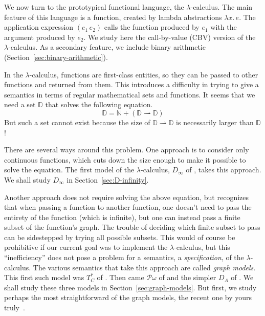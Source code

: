 \documentclass{tufte-handout}
\newcommand{\LAM}[1]{\lambda #1.\,}
\newcommand{\pto}[0]{\rightharpoonup}
\begin{document}
We now turn to the prototypical functional language, the
$\lambda$-calculus. The main feature of this language is a function,
created by lambda abstractions $\LAM{x}e$. The application expression
$(e_1\,e_2)$ calls the function produced by $e_1$ with the argument
produced by $e_2$. We study here the call-by-value (CBV) version of
the $\lambda$-calculus.  As a secondary feature, we include binary
arithmetic (Section~\ref{sec:binary-arithmetic}).

In the $\lambda$-calculus, functions are first-class entities, so they
can be passed to other functions and returned from them. This
introduces a difficulty in trying to give a semantics in terms of
regular mathematical sets and functions. It seems that we need a set
$\mathbb{D}$ that solves the following equation.
\[
   \mathbb{D} = \mathbb{N} + (\mathbb{D} \pto \mathbb{D})
\]
But such a set cannot exist because the size of $\mathbb{D} \pto
\mathbb{D}$ is necessarily larger than $\mathbb{D}$!

There are several ways around this problem. One approach is to
consider only continuous functions, which cuts down the size enough to
make it possible to solve the equation. The first model of the
$\lambda$-calculus, $D_\infty$ of \citet{Scott:1970dp}, takes this
approach. We shall study $D_\infty$ in Section~\ref{sec:D-infinity}.

Another approach does not require solving the above equation, but
recognizes that when passing a function to another function, one
doesn't need to pass the entirety of the function (which is infinite),
but one can instead pass a finite subset of the function's graph.  The
trouble of deciding which finite subset to pass can be sidestepped by
trying all possible subsets. This would of course be prohibitive if
our current goal was to implement the $\lambda$-calculus, but this
``inefficiency'' does not pose a problem for a semantics, a
\emph{specification}, of the $\lambda$-calculus. The various semantics
that take this approach are called \emph{graph models}. This first
such model was $T^{*}_C$ of \citet{Plotkin:1972aa}. Then came
$\mathcal{P}\omega$ of \citet{Scott:1976lq} and the simpler $D_A$ of
\citet{Engeler:1981aa}. We shall study these three models in
Section~\ref{sec:graph-models}. But first, we study perhaps the most
straightforward of the graph models, the recent one by yours
truly~\citep{Siek:2017ab}.
\end{document}
